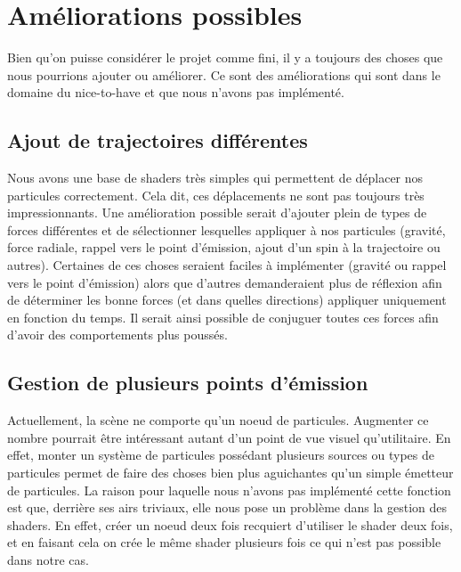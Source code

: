 \chapter{Améliorations possibles}


Bien qu'on puisse considérer le projet comme fini, il y a toujours des choses
que nous pourrions ajouter ou améliorer. Ce sont des améliorations qui sont
dans le domaine du nice-to-have et que nous n'avons pas implémenté.

\section{Ajout de trajectoires différentes}
Nous avons une base de shaders très simples qui permettent de déplacer nos
particules correctement. Cela dit, ces déplacements ne sont pas toujours très
impressionnants. Une amélioration possible serait d'ajouter plein de types de
forces différentes et de sélectionner lesquelles appliquer à nos particules
(gravité, force radiale, rappel vers le point d'émission, ajout d'un spin à la
trajectoire ou autres). Certaines de ces choses seraient faciles à implémenter (gravité
ou rappel vers le point d'émission) alors que d'autres demanderaient plus de réflexion
afin de déterminer les bonne forces (et dans quelles directions) appliquer uniquement
en fonction du temps. Il serait ainsi possible de conjuguer toutes ces forces
afin d'avoir des comportements plus poussés.

\section{Gestion de plusieurs points d'émission}
Actuellement, la scène ne comporte qu'un noeud de particules. Augmenter ce
nombre pourrait être intéressant autant d'un point de vue visuel qu'utilitaire.
En effet, monter un système de particules possédant plusieurs sources ou types
de particules permet de faire des choses bien plus aguichantes qu'un simple émetteur
de particules. La raison pour laquelle nous n'avons pas implémenté cette fonction est
que, derrière ses airs triviaux, elle nous pose un problème dans la gestion des shaders.
En effet, créer un noeud deux fois recquiert d'utiliser le shader deux fois, et en faisant
cela on crée le même shader plusieurs fois ce qui n'est pas possible dans notre cas.

